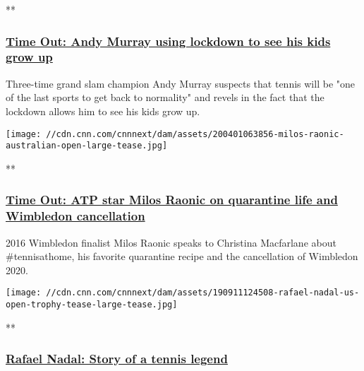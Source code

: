 **

\hypertarget{time-out-andy-murray-using-lockdown-to-see-his-kids-grow-up}{%
\subsubsection{\texorpdfstring{\href{/videos/sports/2020/04/22/andy-murray-time-out-seeing-kids-yoga-tennis-not-returning-spt-intl-lon-orig.cnn}{Time
Out: Andy Murray using lockdown to see his kids grow
up}}{Time Out: Andy Murray using lockdown to see his kids grow up}}\label{time-out-andy-murray-using-lockdown-to-see-his-kids-grow-up}}

Three-time grand slam champion Andy Murray suspects that tennis will be
"one of the last sports to get back to normality" and revels in the fact
that the lockdown allows him to see his kids grow up.

\href{/videos/sports/2020/04/03/milos-raonic-tennis-at-home-quarantine-atp-wimbledon-cancellation-spt-intl-lon-orig.cnn}{}

\texttt{[image: //cdn.cnn.com/cnnnext/dam/assets/200401063856-milos-raonic-australian-open-large-tease.jpg]}

**

\hypertarget{time-out-atp-star-milos-raonic-on-quarantine-life-and-wimbledon-cancellation}{%
\subsubsection{\texorpdfstring{\href{/videos/sports/2020/04/03/milos-raonic-tennis-at-home-quarantine-atp-wimbledon-cancellation-spt-intl-lon-orig.cnn}{Time
Out: ATP star Milos Raonic on quarantine life and Wimbledon
cancellation}}{Time Out: ATP star Milos Raonic on quarantine life and Wimbledon cancellation}}\label{time-out-atp-star-milos-raonic-on-quarantine-life-and-wimbledon-cancellation}}

2016 Wimbledon finalist Milos Raonic speaks to Christina Macfarlane
about \#tennisathome, his favorite quarantine recipe and the
cancellation of Wimbledon 2020.

\href{/videos/sports/2019/09/06/rafael-nadal-story-of-a-champion-tennis-french-open-mallorca-football-vision-spt-intl-lon-orig.cnn}{}

\texttt{[image: //cdn.cnn.com/cnnnext/dam/assets/190911124508-rafael-nadal-us-open-trophy-tease-large-tease.jpg]}

**

\hypertarget{rafael-nadal-story-of-a-tennis-legend}{%
\subsubsection{\texorpdfstring{\href{/videos/sports/2019/09/06/rafael-nadal-story-of-a-champion-tennis-french-open-mallorca-football-vision-spt-intl-lon-orig.cnn}{Rafael
Nadal: Story of a tennis
legend}}{Rafael Nadal: Story of a tennis legend}}\label{rafael-nadal-story-of-a-tennis-legend}}


